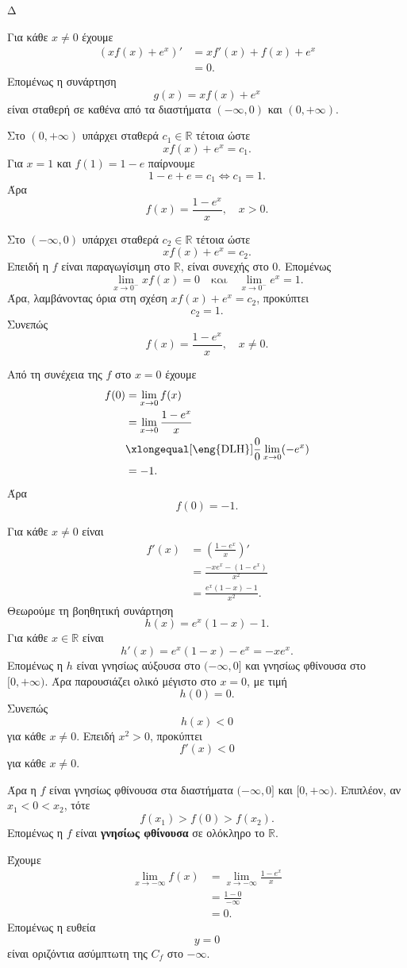 \begin{thema}{Δ}
\begin{erwthma}
\item Για κάθε $x\neq0$ έχουμε
\begin{align*}
\left(xf(x)+e^x\right)'
&=xf'(x)+f(x)+e^x\\
&=0.
\end{align*}
Επομένως η συνάρτηση
\[
g(x)=xf(x)+e^x
\]
είναι σταθερή σε καθένα από τα διαστήματα $(-\infty,0)$ και $(0,+\infty)$.

Στο $(0,+\infty)$ υπάρχει σταθερά $c_1\in\mathbb{R}$ τέτοια ώστε
\[
xf(x)+e^x=c_1.
\]
Για $x=1$ και $f(1)=1-e$ παίρνουμε
\[
1-e+e=c_1\Leftrightarrow c_1=1.
\]
Άρα
\[
f(x)=\frac{1-e^x}{x},\quad x>0.
\]

Στο $(-\infty,0)$ υπάρχει σταθερά $c_2\in\mathbb{R}$ τέτοια ώστε
\[
xf(x)+e^x=c_2.
\]
Επειδή η $f$ είναι παραγωγίσιμη στο $\mathbb{R}$, είναι συνεχής στο $0$. Επομένως
\[
\lim_{x\to0^-}xf(x)=0
\quad\text{και}\quad
\lim_{x\to0^-}e^x=1.
\]
Άρα, λαμβάνοντας όρια στη σχέση $xf(x)+e^x=c_2$, προκύπτει
\[
c_2=1.
\]
Συνεπώς
\[
{f(x)=\frac{1-e^x}{x}},\quad x\neq0.
\]

\item Από τη συνέχεια της $f$ στο $x=0$ έχουμε
\begin{align*}
f(0)
&=\lim_{x\to0}f(x)\\
&=\lim_{x\to0}\frac{1-e^x}{x}\\
&\xlongequal[\text{\eng{DLH}}]{\frac{0}{0}}
\lim_{x\to0}(-e^x)\\
&=-1.
\end{align*}
Άρα
\[
{f(0)=-1}.
\]

\item Για κάθε $x\neq0$ είναι
\begin{align*}
f'(x)
&=\left(\frac{1-e^x}{x}\right)'\\
&=\frac{-xe^x-(1-e^x)}{x^2}\\
&=\frac{e^x(1-x)-1}{x^2}.
\end{align*}
Θεωρούμε τη βοηθητική συνάρτηση
\[
h(x)=e^x(1-x)-1.
\]
Για κάθε $x\in\mathbb{R}$ είναι
\[
h'(x)=e^x(1-x)-e^x=-xe^x.
\]
Επομένως η $h$ είναι γνησίως αύξουσα στο $(-\infty,0]$ και γνησίως φθίνουσα στο $[0,+\infty)$. Άρα παρουσιάζει ολικό μέγιστο στο $x=0$, με τιμή
\[
h(0)=0.
\]
Συνεπώς
\[
h(x)<0
\]
για κάθε $x\neq0$. Επειδή $x^2>0$, προκύπτει
\[
f'(x)<0
\]
για κάθε $x\neq0$.

Άρα η $f$ είναι γνησίως φθίνουσα στα διαστήματα $(-\infty,0]$ και $[0,+\infty)$. Επιπλέον, αν $x_1<0<x_2$, τότε
\[
f(x_1)>f(0)>f(x_2).
\]
Επομένως η $f$ είναι \textbf{γνησίως φθίνουσα} σε ολόκληρο το $\mathbb{R}$.

\item Έχουμε
\begin{align*}
\lim_{x\to-\infty}f(x)
&=\lim_{x\to-\infty}\frac{1-e^x}{x}\\
&=\frac{1-0}{-\infty}\\
&=0.
\end{align*}
Επομένως η ευθεία
\[
{y=0}
\]
είναι οριζόντια ασύμπτωτη της $C_f$ στο $-\infty$.
\end{erwthma}
\end{thema}
